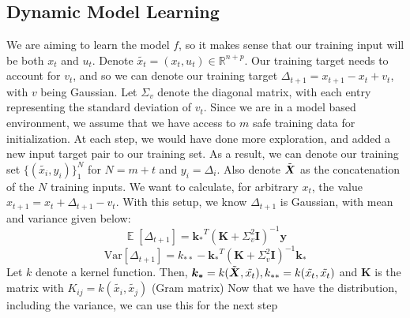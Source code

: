 \documentclass{article}
\newcommand{\R}{\ensuremath{\mathbb{R}}}
\newcommand{\Var}{\mathrm{Var}}
\DeclareMathOperator*{\E}{\mathbb{E}}
\renewcommand{\vec}[1]{\ensuremath{\boldsymbol{#1}}}
\begin{document}
\subsection{Dynamic Model Learning}
We are aiming to learn the model $f$, so it makes sense that our training input will be both $x_t$ and $u_t$. Denote $\tilde{x_t} = (x_t, u_t) \in \R^{n + p}$. Our training target needs to account for $v_t$, and so we can denote our training target $\Delta_{t + 1} = x_{t + 1} - x_t + v_t$, with $v$ being Gaussian. Let $\Sigma_v$ denote the diagonal matrix, with each entry representing the standard deviation of $v_t$. Since we are in a model based environment, we assume that we have access to $m$ safe training data for initialization. At each step, we would have done more exploration, and added a new input target pair to our training set. As a result, we can denote our training set $\{(\tilde{x_i}, y_i)\}_1^N$ for $N = m + t$ and $y_i = \Delta_i$. Also denote $\Tilde{\vec{X}}$ as the concatenation of the $N$ training inputs. We want to calculate, for arbitrary $x_t$, the value $x_{t + 1} = x_t + \Delta_{t + 1} - v_t$. With this setup, we know $\Delta_{t + 1}$ is Gaussian, with mean and variance given below: 
\begin{equation}
    \E[\Delta_{t + 1}] = \vec{k_*}^T(\vec{K} + \Sigma_v^2\vec{I})^{-1}\vec{y}
\end{equation}
\begin{equation}
    \Var[\Delta_{t + 1}] = k_{**} - \vec{k_*}^T(\vec{K} + \Sigma_v^2\vec{I})^{-1}\vec{k_*}
\end{equation}
Let $k$ denote a kernel function. Then, $\vec{k_*} = k(\Tilde{\vec{X}}, \tilde{x_t}), k_{**} = k(\tilde{x_t}, \tilde{x_t})$ and $\vec{K}$ is the matrix with $K_{ij} = k(\tilde{x_i}, \tilde{x_j})$ (Gram matrix) Now that we have the distribution, including the variance, we can use this for the next step
\end{document}
